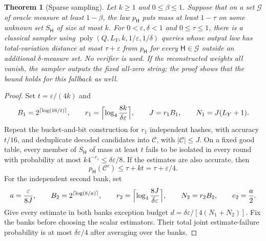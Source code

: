 \documentclass[11pt]{article}
\newtheorem{theorem}{Theorem}[section]
\theoremstyle{definition}\newtheorem{definition}[theorem]{Definition}
\theoremstyle{remark}\newtheorem{remark}[theorem]{Remark}
\newcommand{\mc}{\mathcal}\newcommand{\eps}{\varepsilon}
\DeclareMathOperator{\poly}{poly}\DeclareMathOperator{\CAdv}{CAdv}
\begin{document}
\begin{theorem}[Sparse sampling]\label{sparse}
Let \(k\ge1\) and \(0\le\beta\le1\). Suppose that on a set \(\mc G\) of oracle measure at least \(1-\beta\), the law \(p_{\mathsf H}\) puts mass at least \(1-\tau\) on some unknown set \(S_{\mathsf H}\) of size at most \(k\). For \(0<\eps,\delta<1\) and \(0\le\tau\le1\), there is a classical sampler using \(\poly(Q,L_Y,k,1/\eps,1/\delta)\) queries whose output law has total-variation distance at most \(\tau+\eps\) from \(p_{\mathsf H}\) for every \(\mathsf H\in\mc G\) outside an additional \(\delta\)-measure set. No verifier is used. If the reconstructed weights all vanish, the sampler outputs the fixed all-zero string; the proof shows that the bound holds for this fallback as well.
\end{theorem}
\begin{proof}
Set \(t=\eps/(4k)\) and
\[
 B_1=2^{\lceil\log(16/t)\rceil},\qquad r_1=\Bigl\lceil\log_4\frac{8k}{\delta\eps}\Bigr\rceil,\qquad J=r_1B_1,\qquad N_1=J(L_Y+1).
\]
Repeat the bucket-and-bit construction for \(r_1\) independent hashes, with accuracy \(t/16\), and deduplicate decoded candidates into \(\mc C\), with \(|\mc C|\le J\). On a fixed good table, every member of \(S_{\mathsf H}\) of mass at least \(t\) fails to be isolated in every round with probability at most \(k4^{-r_1}\le\delta\eps/8\). If the estimates are also accurate, then
\[
 p_{\mathsf H}(\mc C^c)\le\tau+kt=\tau+\eps/4.
\]
For the independent second bank, set
\[
 a=\frac\eps{8J},\qquad B_2=2^{\lceil\log(8/a)\rceil},\qquad r_2=\Bigl\lceil\log_4\frac{8J}{\delta\eps}\Bigr\rceil,\qquad N_2=r_2B_2,\qquad e_2=\frac a2.
\]
Give every estimate in both banks exception budget \(d=\delta\eps/[4(N_1+N_2)]\). Fix the banks before choosing the scalar estimators. Their total joint estimate-failure probability is at most \(\delta\eps/4\) after averaging over the banks.


\end{proof}
\end{document}

